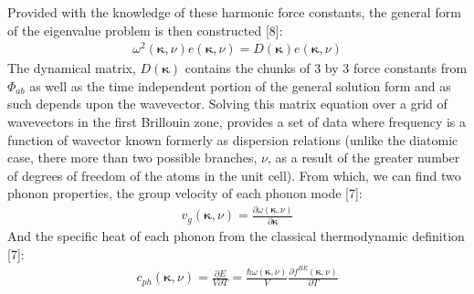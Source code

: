\documentclass{article}
\numberwithin{equation}{section}
\begin{document}
Provided with the knowledge of these harmonic force constants, the general form of the eigenvalue problem is then constructed [8]:
\begin{align*}
	\omega^2(\pmb{\kappa},\nu) e(\pmb{\kappa},\nu)=D(\pmb{\kappa})e(\pmb{\kappa},\nu) 
\end{align*}
The dynamical matrix, $D(\pmb{\kappa})$ contains the chunks of 3 by 3 force constants from $\Phi_{ab}$ as well as the time independent portion of the general solution form and as such depends upon the wavevector. Solving this matrix equation over a grid of wavevectors in the first Brillouin zone, provides a set of data where frequency is a function of wavector known formerly as dispersion relations (unlike the diatomic case, there more than two possible branches, $\nu$, as a result of the greater number of degrees of freedom of the atoms in the unit cell). From which, we can find two phonon properties, the group velocity of each phonon mode [7]:
\begin{align*}
v_g(\pmb{\kappa}, \nu)=\frac{\partial \omega(\pmb{\kappa},\nu)}{\partial \pmb{\kappa}}
\end{align*}
And the specific heat of each phonon from the classical thermodynamic definition [7]:  
\begin{align*}
c_{ph}(\pmb{\kappa},\nu)=\frac{\partial E}{V\partial T}=\frac{\hbar\omega(\pmb{\kappa},\nu)}{V}\frac{\partial f^{BE}(\pmb{\kappa}, \nu)}{\partial T}	
\end{align*}
 
\end{document}
